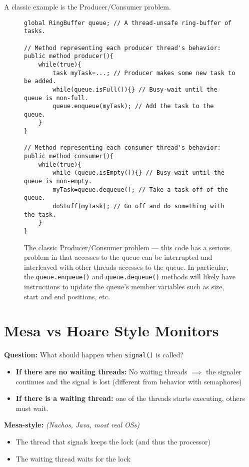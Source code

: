 A classic example is the Producer/Consumer problem.

\begin{figure}[h]
\begin{verbatim}
global RingBuffer queue; // A thread-unsafe ring-buffer of tasks.

// Method representing each producer thread's behavior:
public method producer(){
    while(true){
        task myTask=...; // Producer makes some new task to be added.
        while(queue.isFull()){} // Busy-wait until the queue is non-full.
        queue.enqueue(myTask); // Add the task to the queue.
    }
}

// Method representing each consumer thread's behavior:
public method consumer(){
    while(true){
        while (queue.isEmpty()){} // Busy-wait until the queue is non-empty.
        myTask=queue.dequeue(); // Take a task off of the queue.
        doStuff(myTask); // Go off and do something with the task.
    }
}

\end{verbatim}
    \caption{The classic Producer/Consumer problem --- this code has a serious
    problem in that accesses to the queue can be interrupted and interleaved
    with other threads accesses to the queue. In particular, the
    \texttt{queue.enqueue()} and \texttt{queue.dequeue()} methods will likely
    have instructions to update the queue's member variables such as size, start
    and end positions, etc.}
\end{figure}






\section{Mesa vs Hoare Style Monitors}

\textbf{Question:} What should happen when \texttt{signal()} is called?
\begin{itemize}
    \item \textbf{If there are no waiting threads:} No waiting threads
        \(\implies \) the signaler continues and the signal is lost (different
        from behavior with semaphores)
    \item \textbf{If there is a waiting thread:} one of the threads starts executing,
        others must wait.
\end{itemize}

\textbf{Mesa-style:} \emph{(Nachos, Java, most real OSs)}
\begin{itemize}
    \item The thread that signals keeps the lock (and thus the processor)
    \item The waiting thread waits for the lock
\end{itemize}

